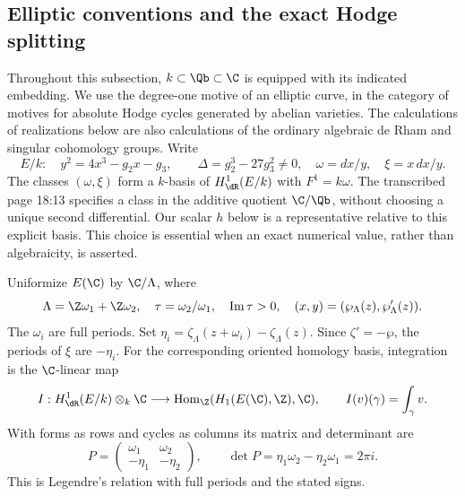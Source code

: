 \subsection{Elliptic conventions and the exact Hodge splitting}

Throughout this subsection, $k\subset\Qb\subset\C$ is equipped with its indicated embedding. We use the degree-one motive of an elliptic curve, in the category of motives for absolute Hodge cycles generated by abelian varieties. The calculations of realizations below are also calculations of the ordinary algebraic de Rham and singular cohomology groups. Write
\[
 E/k:\quad y^2=4x^3-g_2x-g_3,\qquad
 \Delta=g_2^3-27g_3^2\ne0,
 \quad \omega=dx/y,\quad \xi=x\,dx/y.
\]
The classes $(\omega,\xi)$ form a $k$-basis of $H^1_{\dR}(E/k)$ with $F^1=k\omega$. The transcribed page 18:13 specifies a class in the additive quotient $\C/\Qb$, without choosing a unique second differential. Our scalar $h$ below is a representative relative to this explicit basis. This choice is essential when an exact numerical value, rather than algebraicity, is asserted.

Uniformize $E(\C)$ by $\C/\Lambda$, where
\[
 \Lambda=\Z\omega_1+\Z\omega_2,\quad
 \tau=\omega_2/\omega_1,\quad\operatorname{Im}\tau>0,
 \quad (x,y)=(\wp_\Lambda(z),\wp'_\Lambda(z)).
\]
The $\omega_i$ are full periods. Set $\eta_i=\zeta_\Lambda(z+\omega_i)-\zeta_\Lambda(z)$. Since $\zeta'=-\wp$, the periods of $\xi$ are $-\eta_i$. For the corresponding oriented homology basis, integration is the $\C$-linear map
\[
 I:H^1_{\dR}(E/k)\otimes_k\C
 \longrightarrow \operatorname{Hom}_{\Z}(H_1(E(\C),\Z),\C),
 \qquad I(v)(\gamma)=\int_\gamma v.
\]
With forms as rows and cycles as columns its matrix and determinant are
\begin{equation}\label{ell:periodmatrix}
 P=\begin{pmatrix}\omega_1&\omega_2\\-\eta_1&-\eta_2\end{pmatrix},
 \qquad \det P=\eta_1\omega_2-\eta_2\omega_1=2\pi i.
\end{equation}
This is Legendre's relation with full periods and the stated signs.

